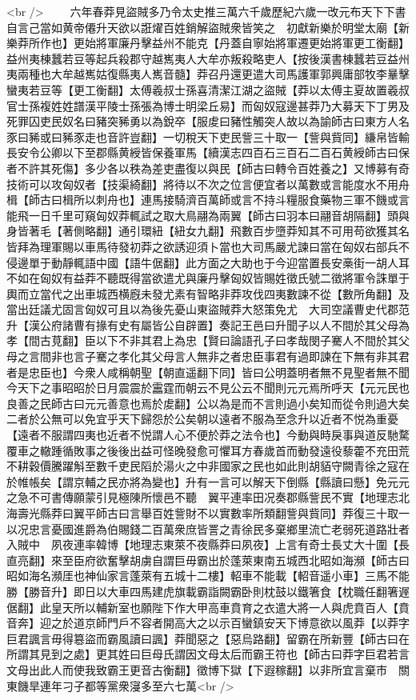 <br />
　　六年春莽見盜賊多乃令太史推三萬六千歲歷紀六歲一改元布天下下書自言己當如黄帝僊升天欲以誑燿百姓銷解盜賊衆皆笑之　初獻新樂於明堂太廟【新樂莽所作也】更始將軍廉丹擊益州不能克【丹蓋自寧始將軍遷更始將軍更工衡翻】益州夷棟蠶若豆等起兵殺郡守越嶲夷人大牟亦叛殺略吏人【按後漢書棟蠶若豆益州夷兩種也大牟越嶲姑復縣夷人嶲音髓】莽召丹還更遣大司馬護軍郭興庸部牧李曅擊蠻夷若豆等【更工衡翻】太傅羲叔士孫喜清潔江湖之盜賊【莽以太傅主夏故置羲叔官士孫複姓姓譜漢平陵士孫張為博士明梁丘易】而匈奴寇邊甚莽乃大募天下丁男及死罪囚吏民奴名曰豬突豨勇以為銳卒【服䖍曰豬性觸突人故以為諭師古曰東方人名豕曰豨或曰豨豕走也音許豈翻】一切稅天下吏民訾三十取一【訾與貲同】縑帛皆輸長安令公卿以下至郡縣黄綬皆保養軍馬【續漢志四百石三百石二百石黄綬師古曰保者不許其死傷】多少各以秩為差吏盡復以與民【師古曰轉令百姓養之】又博募有奇技術可以攻匈奴者【技渠綺翻】將待以不次之位言便宜者以萬數或言能度水不用舟楫【師古曰楫所以刺舟也】連馬接騎濟百萬師或言不持斗糧服食藥物三軍不饑或言能飛一日千里可窺匈奴莽輒試之取大鳥翮為兩翼【師古曰羽本曰翮音胡隔翻】頭與身皆著毛【著側略翻】通引環紐【紐女九翻】飛數百步墮莽知其不可用苟欲獲其名皆拜為理軍賜以車馬待發初莽之欲誘迎須卜當也大司馬嚴尤諫曰當在匈奴右部兵不侵邊單于動靜輒語中國【語牛倨翻】此方面之大助也于今迎當置長安槀街一胡人耳不如在匈奴有益莽不聽既得當欲遣尤與廉丹擊匈奴皆賜姓徵氏號二徵將軍令誅單于輿而立當代之出車城西横廐未發尤素有智略非莽攻伐四夷數諫不從【數所角翻】及當出廷議尤固言匈奴可且以為後先憂山東盜賊莽大怒策免尤　大司空議曹史代郡范升【漢公府諸曹有掾有史有屬皆公自辟置】奏記王邑曰升聞子以人不間於其父母為孝【間古莧翻】臣以下不非其君上為忠【賢曰論語孔子曰孝哉閔子騫人不間於其父母之言間非也言子騫之孝化其父母言人無非之者忠臣事君有過即諫在下無有非其君者是忠臣也】今衆人咸稱朝聖【朝直遥翻下同】皆曰公明蓋明者無不見聖者無不聞今天下之事昭昭於日月震震於靁霆而朝云不見公云不聞則元元焉所呼天【元元民也良善之民師古曰元元善意也焉於䖍翻】公以為是而不言則過小矣知而從令則過大矣二者於公無可以免宜乎天下歸怨於公矣朝以遠者不服為至念升以近者不悦為重憂【遠者不服謂四夷也近者不悦謂人心不便於莽之法令也】今動與時戾事與道反馳騖覆車之轍踵循敗事之後後出益可怪晚發愈可懼耳方春歲首而動發遠役藜藿不充田荒不耕穀價騰躍斛至數千吏民䧟於湯火之中非國家之民也如此則胡貊守闕青徐之寇在於帷帳矣【謂京輔之民亦將為變也】升有一言可以解天下倒縣【縣讀曰懸】免元元之急不可書傳願蒙引見極陳所懷邑不聽　翼平連率田况奏郡縣訾民不實【地理志北海壽光縣莽曰翼平師古曰言舉百姓訾財不以實數率所類翻訾與貲同】莽復三十取一以况忠言憂國進爵為伯賜錢二百萬衆庶皆詈之青徐民多棄鄉里流亡老弱死道路壯者入賊中　夙夜連率韓博【地理志東萊不夜縣莽曰夙夜】上言有奇士長丈大十圍【長直亮翻】來至臣府欲奮擊胡虜自謂巨毋霸出於蓬萊東南五城西北昭如海瀕【師古曰昭如海名瀕厓也神仙家言蓬萊有五城十二樓】軺車不能載【軺音遥小車】三馬不能勝【勝音升】即日以大車四馬建虎旗載霸詣闕霸卧則枕鼓以鐵箸食【枕職任翻箸遟倨翻】此皇天所以輔新室也願陛下作大甲高車賁育之衣遣大將一人與虎賁百人【賁音奔】迎之於道京師門戶不容者開高大之以示百蠻鎮安天下博意欲以風莽【以莽字巨君諷言毋得簒盜而霸風讀曰諷】莽聞惡之【惡烏路翻】留霸在所新豐【師古曰在所謂其見到之處】更其姓曰巨母氏謂因文母太后而霸王符也【師古曰莽字巨君若言文母出此人而使我致霸王更音古衡翻】徵博下獄【下遐稼翻】以非所宜言棄市　關東饑旱連年刁子都等黨衆寖多至六七萬<br />
